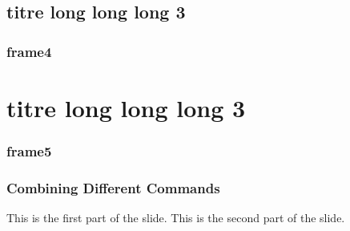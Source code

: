 \documentclass{beamer}
\begin{document}
\subsection[titre court3]{titre long long long 3}
\begin{frame}
  \frametitle{frame4}
\end{frame}

\section[titre court3]{titre long long long 3}
\begin{frame}
  \frametitle{frame5}
\end{frame}
\begin{frame}
  \frametitle{Combining Different Commands}
  This is the first part of the slide.\newline
  \pause
  This is the second part of the slide.\\
\end{frame}
\end{document}
